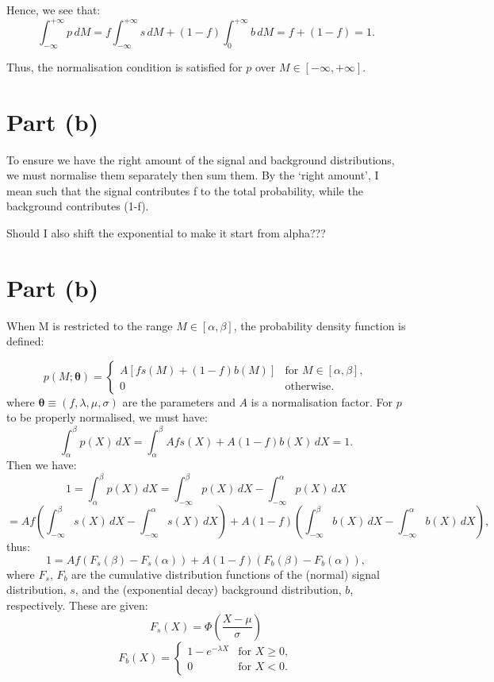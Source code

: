 \documentclass{article}
\begin{document}
Hence, we see that:
\[ 
\int_{-\infty}^{+\infty} p \, dM = 
f\int_{-\infty}^{+\infty} s \, dM + 
(1-f)\int_{0}^{+\infty} b \, dM =
f + (1-f) = 1.
\]

Thus, the normalisation condition is satisfied for $p$ over $M \in [-\infty, +\infty]$.

\section*{Part (b)}

To ensure we have the right amount of the signal and background distributions, we must normalise them separately then sum them. By the ‘right amount’, I mean such that the signal contributes f to the total probability, while the background contributes (1-f).

Should I also shift the exponential to make it start from alpha???

\section*{Part (b)}

When M is restricted to the range $M \in [\alpha, \beta]$, the probability density function is defined:

\[ 
p(M; \boldsymbol{\theta}) = 
\begin{cases} 
A[fs(M) + (1-f)b(M)] & \text{for } M \in [\alpha, \beta], \\
0 & \text{otherwise}.
\end{cases}
\]
where $\boldsymbol{\theta} \equiv (f, \lambda, \mu, \sigma)$ are the parameters and $A$ is a normalisation factor. For $p$ to be properly normalised, we must have:
\[
\int_{\alpha}^{\beta} p(X) \, dX =
\int_{\alpha}^{\beta} Afs(X) + A(1-f)b(X) \, dX = 1.
\]
Then we have:
\[
1 = \int_{\alpha}^{\beta} p(X) \, dX = 
\int_{-\infty}^{\beta} p(X) \, dX - \int_{-\infty}^{\alpha} p(X) \, dX
\]
\[
= Af \left( \int_{-\infty}^{\beta} s(X) \, dX - \int_{-\infty}^{\alpha} s(X) \, dX \right) +
A(1-f)\left( \int_{-\infty}^{\beta} b(X) \, dX - \int_{-\infty}^{\alpha} b(X) \, dX \right),
\]
thus:
\[
1 = Af \left( F_s(\beta) - F_s(\alpha) \right) +
A(1-f)\left( F_b(\beta) - F_b(\alpha) \right),
\]
where $F_s$, $F_b$ are the cumulative distribution functions of the (normal) signal distribution, $s$, and the (exponential decay) background distribution, $b$, respectively. These are given:
\[
F_s(X) = \Phi(\frac{X-\mu}{\sigma})
\]
\[
F_b(X) = 
\begin{cases} 
1 - e^{-\lambda X} & \text{for } X \geq 0, \\
0 & \text{for } X < 0.
\end{cases}
\]
\end{document}
